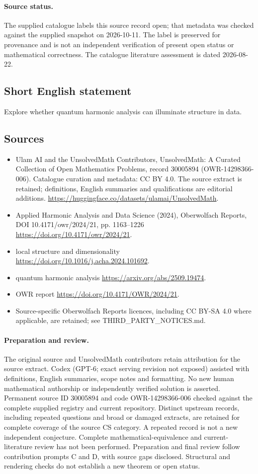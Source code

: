 \documentclass[11pt]{article}
\begin{document}
\paragraph{Source status.}
The supplied catalogue labels this source record open; that metadata was checked against the supplied snapshot on 2026-10-11. The label is preserved for provenance and is not an independent verification of present open status or mathematical correctness. The catalogue literature assessment is dated 2026-08-22.
\subsection{Short English statement}
Explore whether quantum harmonic analysis can illuminate structure in data.
\subsection{Sources}
\begin{itemize}
\item[S1] Ulam AI and the UnsolvedMath Contributors, UnsolvedMath: A Curated Collection of Open Mathematics Problems, record 30005894 (OWR-14298366-006). Catalogue curation and metadata: CC BY 4.0. The source extract is retained; definitions, English summaries and qualifications are editorial additions.
\url{https://huggingface.co/datasets/ulamai/UnsolvedMath}.
\item[S2] Applied Harmonic Analysis and Data Science (2024), Oberwolfach Reports, DOI 10.4171/owr/2024/21, pp. 1163--1226
\url{https://doi.org/10.4171/owr/2024/21}.
\item[S3] local structure and dimensionality
\url{https://doi.org/10.1016/j.acha.2024.101692}.
\item[S4] quantum harmonic analysis
\url{https://arxiv.org/abs/2509.19474}.
\item[S5] OWR report
\url{https://doi.org/10.4171/OWR/2024/21}.
\item Source-specific Oberwolfach Reports licences, including CC BY-SA 4.0 where applicable, are retained; see THIRD\_PARTY\_NOTICES.md.
\end{itemize}
\paragraph{Preparation and review.}
The original source and UnsolvedMath contributors retain attribution for the source extract. Codex (GPT-6; exact serving revision not exposed) assisted with definitions, English summaries, scope notes and formatting. No new human mathematical authorship or independently verified solution is asserted. Permanent source ID 30005894 and code OWR-14298366-006 checked against the complete supplied registry and current repository. Distinct upstream records, including repeated questions and broad or damaged extracts, are retained for complete coverage of the source CS category. A repeated record is not a new independent conjecture. Complete mathematical-equivalence and current-literature review has not been performed. Preparation and final review follow contribution prompts C and D, with source gaps disclosed. Structural and rendering checks do not establish a new theorem or open status.
\label{end:30005894}
\end{document}
